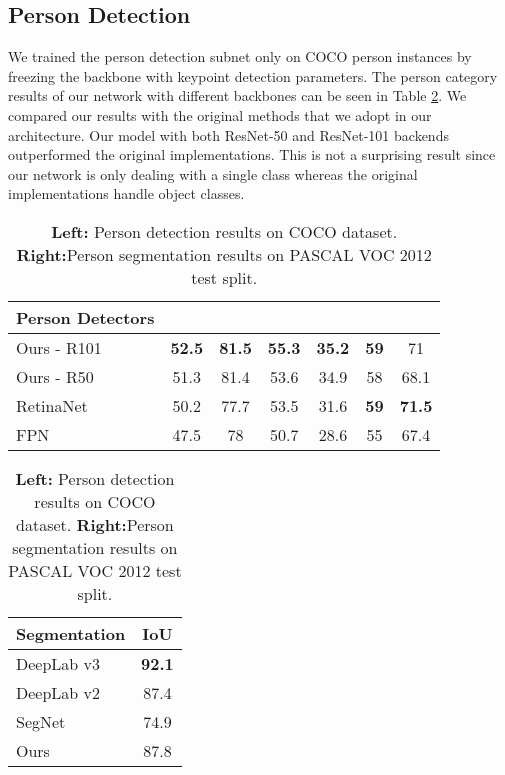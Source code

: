 \documentclass[runningheads]{llncs}
\begin{document}
\subsection{Person Detection}
We trained the person detection subnet only on COCO person instances by freezing the backbone with keypoint detection parameters. The person category results of our network with different backbones can be seen in Table \ref{table:person}. We compared our results with the original methods that we adopt in our architecture. Our model with both ResNet-50 and ResNet-101 backends outperformed the original implementations. This is not a surprising result since our network is only dealing with a single class whereas the original implementations handle  object classes. 




\begin{table}[h]
\begin{center}
\caption{\textbf{Left:} Person detection results on COCO dataset. \textbf{Right:}Person segmentation results on PASCAL VOC 2012 test split.}
\label{table:person}
\begin{tabular}{l||cccccc}
\hline
\textbf{Person Detectors} &  &  &  &  &  &  \\ \hline
Ours - R101 & \textbf{52.5} & \textbf{81.5} & \textbf{55.3} & \textbf{35.2} & \textbf{59} & 71 \\
Ours - R50 & 51.3 & 81.4 & 53.6 & 34.9 & 58 & 68.1 \\
RetinaNet \cite{Lin2017} & 50.2 & 77.7 & 53.5 & 31.6 & \textbf{59} & \textbf{71.5} \\
FPN \cite{Lina} & 47.5 & 78 & 50.7 & 28.6 & 55 & 67.4 \\ \hline
\end{tabular}
\quad
\begin{tabular}{l||c}
\hline
\textbf{Segmentation} & \textbf{IoU} \\ \hline
DeepLab v3 \cite{Chen} & \textbf{92.1} \\ 
DeepLab v2 \cite{Chen2016} & 87.4 \\ 
SegNet \cite{kendall2015bayesian} & 74.9 \\ \hline
Ours & 87.8 \\ \hline
\end{tabular}
\end{center}
\end{table}
\end{document}
